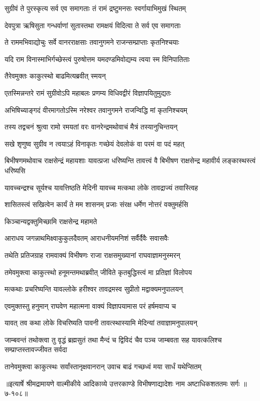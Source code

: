 \twolineshloka
{सुग्रीवं ते पुरस्कृत्य सर्व एव समागताः}
{तं रामं द्रष्टुमनसः स्वर्गायाभिमुखं स्थितम्} %

\twolineshloka
{देवपुत्रा ऋषिसुता गन्धर्वाणां सुतास्तथा}
{रामक्षयं विदित्वा ते सर्व एव समागताः} %

\twolineshloka
{ते राममभिवाद्योचुः सर्वे वानरराक्षसाः}
{तवानुगमने राजन्सम्प्राप्ताः कृतनिश्चयाः} %

\twolineshloka
{यदि राम विनास्माभिर्गच्छेस्त्वं पुरुषोत्तम}
{यमदण्डमिवोद्यम्य त्वया स्म विनिपातिताः} %

\onelineshloka
{तैरेवमुक्तः काकुत्स्थो बाढमित्यब्रवीत् स्मयन्} %

\twolineshloka
{एतस्मिन्नन्तरे रामं सुग्रीवोऽपि महाबलः}
{प्रणम्य विधिवद्वीरं विज्ञापयितुमुद्यतः} %

\twolineshloka
{अभिषिच्याङ्गदं वीरमागतोऽस्मि नरेश्वर}
{तवानुगमने राजन्विद्धि मां कृतनिश्चयम्} %

\twolineshloka
{तस्य तद्वचनं श्रुत्वा रामो रमयतां वरः}
{वानरेन्द्रमथोवाचं मैत्रं तस्यानुचिन्तयन्} %

\twolineshloka
{सखे शृणुष्व सुग्रीव न त्वयाऽहं विनाकृतः}
{गच्छेयं देवलोकं वा परमं वा पदं महत्} %

\threelineshloka
{बिभीषणमथोवाच राक्षसेन्द्रं महायशाः}
{यावत्प्रजा धरिष्यन्ति तावत्त्वं वै बिभीषण}
{राक्षसेन्द्र महावीर्य लङ्कास्थस्त्वं धरिष्यसि} %

\twolineshloka
{यावच्चन्द्रश्च सूर्यश्च यावत्तिष्ठति मेदिनी}
{यावच्च मत्कथा लोके तावद्राज्यं तवास्त्विह} %

\twolineshloka
{शासितस्त्वं सखित्वेन कार्यं ते मम शासनम्}
{प्रजाः संरक्ष धर्मेण नोत्तरं वक्तुमर्हसि} %

\onelineshloka
{किञ्चान्यद्वक्तुमिच्छामि राक्षसेन्द्र महामते} %

\twolineshloka
{आराधय जगन्नाथमिक्ष्वाकुकुलदैवतम्}
{आराधनीयमनिशं सर्वैर्दैवैः सवासवैः} %

\twolineshloka
{तथेति प्रतिजग्राह रामवाक्यं विभीषणः}
{राजा राक्षसमुख्यानां राघवाज्ञामनुस्मरन्} %

\twolineshloka
{तमेवमुक्त्वा काकुत्स्थो हनूमन्तमथाब्रवीत्}
{जीविते कृतबुद्धिस्त्वं मा प्रतिज्ञां विलोपय} %

\twolineshloka
{मत्कथाः प्रचरिष्यन्ति यावल्लोके हरीश्वर}
{तावद्रमस्व सुप्रीतो मद्वाक्यमनुपालयन्} %

\twolineshloka
{एवमुक्तस्तु हनुमान् राघवेण महात्मना}
{वाक्यं विज्ञापयामास परं हर्षमवाप्य च} %

\twolineshloka
{यावत् तव कथा लोके विचरिष्यति पावनी}
{तावत्स्थास्यामि मेदिन्यां तवाज्ञामनुपालयन्} %

\threelineshloka
{जाम्बवन्तं तथोक्त्वा तु वृद्धं ब्रह्मसुतं तथा}
{मैन्दं च द्विविदं चैव पञ्च जाम्बवता सह}
{यावत्कलिश्च सम्प्राप्तस्तावज्जीवत सर्वदा} %

\twolineshloka
{तानेवमुक्त्वा काकुत्स्थः सर्वांस्तानृक्षवानरान्}
{उवाच बाढं गच्छध्वं मया सार्धं यथेप्सितम्} %


॥इत्यार्षे श्रीमद्रामायणे वाल्मीकीये आदिकाव्ये उत्तरकाण्डे विभीषणाद्यादेशः नाम अष्टाधिकशततमः सर्गः ॥७-१०८॥
